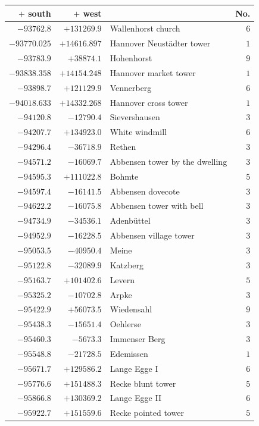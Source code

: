 \begin{center}\begingroup\fontsize{8}{9}\selectfont
\setlength{\tabcolsep}{4pt}
\begin{tabular}{r|r|p{170pt}|r}\hline
\(+\) south&\(+\) west&&No.\\\hline
\(-93762.8\)&\(+131269.9\)&Wallenhorst church&\(6\)\\
\(-93770.025\)&\(+14616.897\)&Hannover Neustädter tower&\(1\)\\
\(-93783.9\)&\(+38874.1\)&Hohenhorst&\(9\)\\
\(-93838.358\)&\(+14154.248\)&Hannover market tower&\(1\)\\
\(-93898.7\)&\(+121129.9\)&Vennerberg&\(6\)\\
\(-94018.633\)&\(+14332.268\)&Hannover cross tower&\(1\)\\
\(-94120.8\)&\(-12790.4\)&Sievershausen&\(3\)\\
\(-94207.7\)&\(+134923.0\)&White windmill&\(6\)\\
\(-94296.4\)&\(-36718.9\)&Rethen&\(3\)\\
\(-94571.2\)&\(-16069.7\)&Abbensen tower by the dwelling&\(3\)\\
\(-94595.3\)&\(+111022.8\)&Bohmte&\(5\)\\
\(-94597.4\)&\(-16141.5\)&Abbensen dovecote&\(3\)\\
\(-94622.2\)&\(-16075.8\)&Abbensen tower with bell&\(3\)\\
\(-94734.9\)&\(-34536.1\)&Adenbüttel&\(3\)\\
\(-94952.9\)&\(-16228.5\)&Abbensen village tower&\(3\)\\
\(-95053.5\)&\(-40950.4\)&Meine&\(3\)\\
\(-95122.8\)&\(-32089.9\)&Katzberg&\(3\)\\
\(-95163.7\)&\(+101402.6\)&Levern&\(5\)\\
\(-95325.2\)&\(-10702.8\)&Arpke&\(3\)\\
\(-95422.9\)&\(+56073.5\)&Wiedensahl&\(9\)\\
\(-95438.3\)&\(-15651.4\)&Oehlerse&\(3\)\\
\(-95460.3\)&\(-5673.3\)&Immenser Berg&\(3\)\\
\(-95548.8\)&\(-21728.5\)&Edemissen&\(1\)\\
\(-95671.7\)&\(+129586.2\)&Lange Egge I&\(6\)\\
\(-95776.6\)&\(+151488.3\)&Recke blunt tower&\(5\)\\
\(-95866.8\)&\(+130369.2\)&Lange Egge II&\(6\)\\
\(-95922.7\)&\(+151559.6\)&Recke pointed tower&\(5\)\\

\end{tabular}
\end{center}
